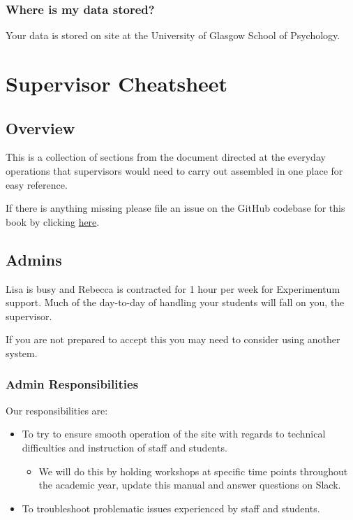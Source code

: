 \documentclass[]{book}
\providecommand{\tightlist}{%
  \setlength{\itemsep}{0pt}\setlength{\parskip}{0pt}}
\begin{document}
\subsection*{Where is my data stored?}\label{where-is-my-data-stored}

Your data is stored on site at the University of Glasgow School of
Psychology.

\chapter*{Supervisor Cheatsheet}\label{supervisor-cheatsheet}

\section*{Overview}\label{overview-9}

This is a collection of sections from the document directed at the
everyday operations that supervisors would need to carry out assembled
in one place for easy reference.

If there is anything missing please file an issue on the GitHub codebase
for this book by clicking
\href{https://github.com/RebeccaJLai/exp_manual/issues}{here}.

\section*{Admins}\label{roles}

Lisa is busy and Rebecca is contracted for 1 hour per week for
Experimentum support. Much of the day-to-day of handling your students
will fall on you, the supervisor.

If you are not prepared to accept this you may need to consider using
another system.

\subsection*{Admin Responsibilities}\label{admin-responsibilities}

Our responsibilities are:

\begin{itemize}
\tightlist
\item
  To try to ensure smooth operation of the site with regards to
  technical difficulties and instruction of staff and students.

  \begin{itemize}
  \tightlist
  \item
    We will do this by holding workshops at specific time points
    throughout the academic year, update this manual and answer
    questions on Slack.
  \end{itemize}
\item
  To troubleshoot problematic issues experienced by staff and students.
\end{itemize}
\end{document}
